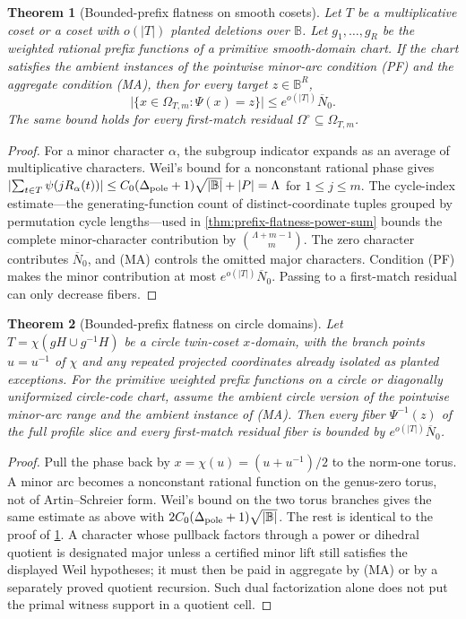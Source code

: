 \documentclass[12pt,a4paper]{amsart}
\numberwithin{equation}{section}
\newtheorem{theorem}{Theorem}[section]
\theoremstyle{remark}
\newcommand{\B}{\mathbb B}
\newcommand{\Omc}{\Omega^{\circ}}
\newcommand{\barN}{\overline N}
\newcommand{\abs}[1]{\lvert #1\rvert}
\begin{document}
\begin{theorem}[Bounded-prefix flatness on smooth cosets]\label{thm:bounded-prefix-equidistribution}
Let \(T\) be a multiplicative coset or a coset with \(o(\abs T)\) planted
deletions over \(\B\).  Let \(g_1,\ldots,g_R\) be the weighted rational
prefix functions of a primitive smooth-domain chart.  If the chart
satisfies the ambient instances of the pointwise minor-arc condition
\textup{(PF)} and the aggregate condition \textup{(MA)}, then for every
target \(z\in\B^R\),
\[
        \abs{\{x\in\Omega_{T,m}:\Psi(x)=z\}}
        \le e^{o(\abs T)}\barN_0.
\]
The same bound holds for every first-match residual
\(\Omc\subseteq\Omega_{T,m}\).
\end{theorem}

\begin{proof}
For a minor character \(\alpha\), the subgroup indicator expands as an
average of multiplicative characters.  Weil's bound for a nonconstant
rational phase gives
\(\abs{\sum_{t\in T}\psi(jR_\alpha(t))}\le
C_0(\Delta_{\rm pole}+1)\sqrt{\abs\B}+\abs P=\Lambda\) for \(1\le j\le m\).  The
cycle-index estimate---the generating-function count of distinct-coordinate
tuples grouped by permutation cycle lengths---used in
\cref{thm:prefix-flatness-power-sum} bounds
the complete minor-character contribution by
\(\binom{\Lambda+m-1}{m}\).  The zero character contributes \(\barN_0\),
and \textup{(MA)} controls the omitted major characters.  Condition
\textup{(PF)} makes the minor contribution at most
\(e^{o(\abs T)}\barN_0\).  Passing to a first-match residual can only decrease
fibers.
\end{proof}

\begin{theorem}[Bounded-prefix flatness on circle domains]\label{thm:circle-prefix-equidistribution}
Let \(T=\chi(gH\cup g^{-1}H)\) be a circle twin-coset \(x\)-domain, with
the branch points \(u=u^{-1}\) of \(\chi\) and any repeated projected
coordinates already isolated as planted exceptions.  For the primitive weighted
prefix functions on a circle or diagonally uniformized circle-code chart,
assume the ambient circle version of the pointwise minor-arc range and
the ambient instance of \textup{(MA)}.  Then every fiber
\(\Psi^{-1}(z)\) of the full profile slice
and every first-match residual fiber
is bounded by \(e^{o(\abs T)}\barN_0\).
\end{theorem}

\begin{proof}
Pull the phase back by \(x=\chi(u)=(u+u^{-1})/2\) to the norm-one torus.
A minor arc becomes a nonconstant rational function on the genus-zero
torus, not of Artin--Schreier form.  Weil's bound on the two torus branches
gives the same estimate as above with
\(2C_0(\Delta_{\rm pole}+1)\sqrt{\abs\B}\).  The rest is identical to
the proof of \cref{thm:bounded-prefix-equidistribution}.  A character
whose pullback factors through a power or dihedral quotient is designated
major unless a certified minor lift still satisfies the displayed Weil
hypotheses; it must then be paid in aggregate by \textup{(MA)} or by a
separately proved quotient recursion.  Such dual factorization alone does
not put the primal witness support in a quotient cell.
\end{proof}
\end{document}
